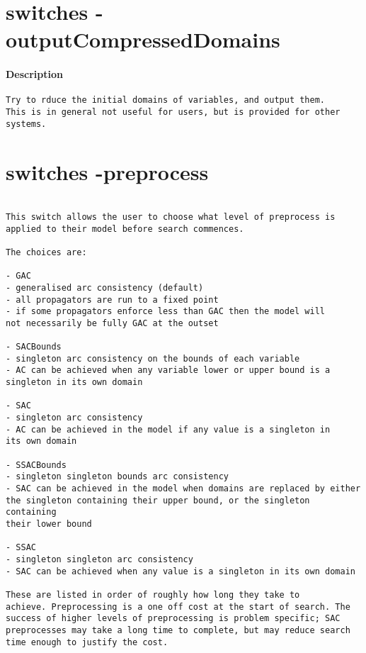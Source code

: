\section{switches -outputCompressedDomains}
\paragraph{Description}
{\footnotesize
\begin{verbatim}
Try to rduce the initial domains of variables, and output them.
This is in general not useful for users, but is provided for other systems.
\end{verbatim}
}
\section{switches -preprocess}
\paragraph{}
{\footnotesize
\begin{verbatim}

This switch allows the user to choose what level of preprocess is
applied to their model before search commences.

The choices are:

- GAC
- generalised arc consistency (default)
- all propagators are run to a fixed point
- if some propagators enforce less than GAC then the model will
not necessarily be fully GAC at the outset

- SACBounds
- singleton arc consistency on the bounds of each variable
- AC can be achieved when any variable lower or upper bound is a
singleton in its own domain

- SAC
- singleton arc consistency
- AC can be achieved in the model if any value is a singleton in
its own domain

- SSACBounds
- singleton singleton bounds arc consistency
- SAC can be achieved in the model when domains are replaced by either
the singleton containing their upper bound, or the singleton containing
their lower bound

- SSAC
- singleton singleton arc consistency
- SAC can be achieved when any value is a singleton in its own domain

These are listed in order of roughly how long they take to
achieve. Preprocessing is a one off cost at the start of search. The
success of higher levels of preprocessing is problem specific; SAC
preprocesses may take a long time to complete, but may reduce search
time enough to justify the cost.
\end{verbatim}
}
